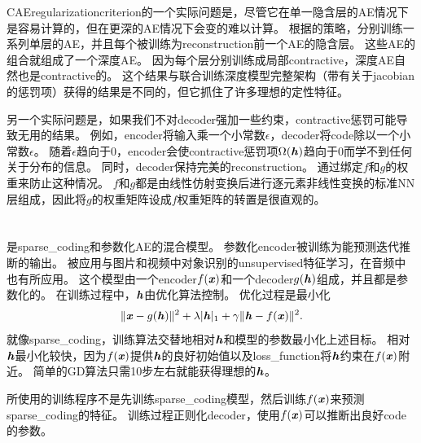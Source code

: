 \gls{CAE}\gls{regularization}\gls{criterion}的一个实际问题是，尽管它在单一隐含层的\gls{AE}情况下是容易计算的，但在更深的\gls{AE}情况下会变的难以计算。
根据\citet{Rifai+al-2011-small}的策略，分别训练一系列单层的\gls{AE}，并且每个被训练为\gls{reconstruction}前一个\gls{AE}的隐含层。
这些\gls{AE}的组合就组成了一个深度\gls{AE}。
因为每个层分别训练成局部\gls{contractive}，深度\gls{AE}自然也是\gls{contractive}的。
这个结果与联合训练深度模型完整架构（带有关于\gls{jacobian}的惩罚项）获得的结果是不同的，但它抓住了许多理想的定性特征。


另一个实际问题是，如果我们不对\gls{decoder}强加一些约束，\gls{contractive}惩罚可能导致无用的结果。
例如，\gls{encoder}将输入乘一个小常数$\epsilon$，\gls{decoder}将\gls{code}除以一个小常数$\epsilon$。
随着$\epsilon$趋向于0，\gls{encoder}会使\gls{contractive}惩罚项$\Omega(\boldsymbol{\mathit{h}})$趋向于0而学不到任何关于分布的信息。
同时，\gls{decoder}保持完美的\gls{reconstruction}。
\citet{Rifai+al-2011-small}通过绑定$f$和$g$的权重来防止这种情况。
$f$和$g$都是由线性仿射变换后进行逐元素非线性变换的标准\gls{NN}层组成，因此将$g$的权重矩阵设成$f$权重矩阵的转置是很直观的。


\section{}
\label{sec:predictive_sparse_decomposition}

是\gls{sparse_coding}和参数化\gls{AE}\citep{koray-psd-08}的混合模型。
参数化\gls{encoder}被训练为能预测迭代推断的输出。
被应用与图片和视频中对象识别的\gls{unsupervised}特征学习\citep{Koray-08-small,koray-nips-10-small,Jarrett-ICCV2009-small,farabet-suml-11}，在音频中也有所应用\citep{henaff-ismir-11-small}。
这个模型由一个\gls{encoder}$f(\boldsymbol{\mathit{x}})$和一个\gls{decoder}$g(\boldsymbol{\mathit{h}})$组成，并且都是参数化的。
在训练过程中，$\boldsymbol{\mathit{h}}$由优化算法控制。
优化过程是最小化
\begin{align}
 \| \boldsymbol{\mathit{x}} - g(\boldsymbol{\mathit{h}}) \| ^2 + \lambda | \boldsymbol{\mathit{h}} |_1 + \gamma \| \boldsymbol{\mathit{h}} - f(\boldsymbol{\mathit{x}}) \|^2.
\end{align}
就像\gls{sparse_coding}，训练算法交替地相对$\boldsymbol{\mathit{h}}$和模型的参数最小化上述目标。
相对$\boldsymbol{\mathit{h}}$最小化较快，因为$f(\boldsymbol{\mathit{x}})$提供$\boldsymbol{\mathit{h}}$的良好初始值以及\gls{loss_function}将$\boldsymbol{\mathit{h}}$约束在$f(\boldsymbol{\mathit{x}})$附近。
简单的\gls{GD}算法只需10步左右就能获得理想的$\boldsymbol{\mathit{h}}$。


所使用的训练程序不是先训练\gls{sparse_coding}模型，然后训练$f(\boldsymbol{\mathit{x}})$来预测\gls{sparse_coding}的特征。
训练过程正则化\gls{decoder}，使用$f(\boldsymbol{\mathit{x}})$可以推断出良好\gls{code}的参数。



